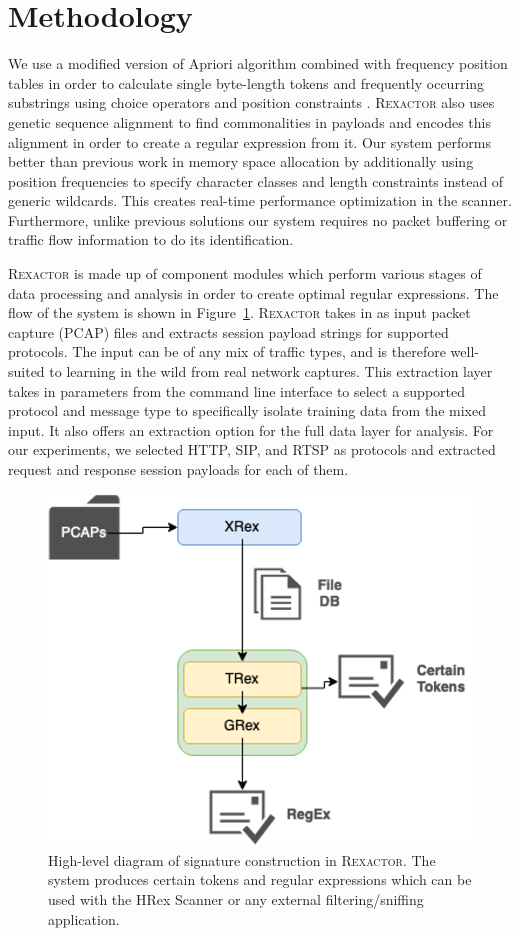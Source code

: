 \section{Methodology}
We use a modified version of Apriori algorithm combined with frequency position tables in order to calculate single byte-length tokens and frequently occurring substrings using choice operators and position constraints \cite{WANG2012992}. \textsc{Rexactor} also uses genetic sequence alignment to find commonalities in payloads and encodes this alignment in order to create a regular expression from it. Our system performs better than previous work in memory space allocation by additionally using position frequencies to specify character classes and length constraints instead of generic wildcards. This creates real-time performance optimization in the scanner. Furthermore, unlike previous solutions our system requires no packet buffering or traffic flow information to do its identification.

\textsc{Rexactor} is made up of component modules which perform various stages of data processing and analysis in order to create optimal regular expressions. The flow of the system is shown in Figure~\ref{f:diagram}. \textsc{Rexactor} takes in as input packet capture (PCAP) files and extracts session payload strings for supported protocols. The input can be of any mix of traffic types, and is therefore well-suited to learning in the wild from real network captures. This extraction layer takes in parameters from the command line interface to select a supported protocol and message type to specifically isolate training data from the mixed input. It also offers an extraction option for the full data layer for analysis. For our experiments, we selected HTTP, SIP, and RTSP as protocols and extracted request and response session payloads for each of them.

\begin{figure}[hbt!]
  \begin{center}
    \includegraphics[width=0.6\columnwidth]{chapters/3/img/diagram.png}
    \caption{High-level diagram of signature construction in \textsc{Rexactor}. The system produces certain tokens and regular expressions which can be used with the HRex Scanner or any external filtering/sniffing application.}
    \label{f:diagram}
  \end{center}
\end{figure}

